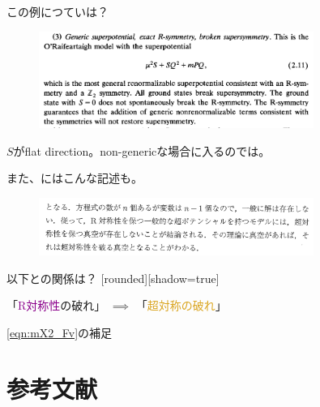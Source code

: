 \documentclass[
  unicode,a4paper,9pt,
  xcolor = {dvipsnames,svgnames},
  hyperref ={colorlinks=true,citecolor=Navy,linkcolor=NavyBlue,urlcolor=purple},
  ja=standard,lualatex
]{beamer}
\begin{document}
\begin{frame}

  この例につていは？
  \begin{figure}
    \centering
    \includegraphics[width=0.8\textwidth]{fig/Nelson1993nf2.PNG}
  \end{figure}
  $S$がflat direction。non-genericな場合に入るのでは。

  また、\cite{R100000002-I027963943}にはこんな記述も。
  \begin{figure}
    \centering
    \includegraphics[width=0.8\textwidth]{fig/sgc.PNG}
  \end{figure}

  以下との関係は？
  [rounded][shadow=true]
  \begin{block}{}
    \centering
    「\textcolor{DarkMagenta}{R対称性}の破れ」
    $\implies$
    「\textcolor{Goldenrod}{超対称の破れ}」
  \end{block}

\end{frame}


\begin{frame}{\eqref{eqn:mX2_Fv}の補足}






\end{frame}






\section{参考文献}
\begin{frame}{\secname}

  \scriptsize
  \beamertemplatetextbibitems
  
  

\end{frame}

\setcounter{framenumber}{\value{Appendix}}
\end{document}
